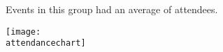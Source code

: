 \documentclass[12pt]{article}
\begin{document}
Events in this group had an average of \averageall attendees.

\texttt{[image: \\attendancechart]}
\end{document}
